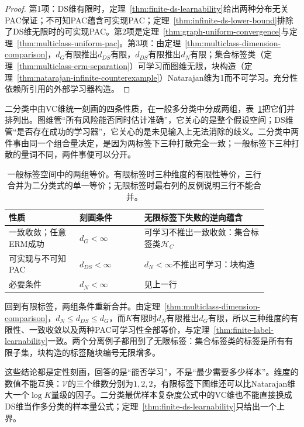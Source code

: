 \begin{proof}
第1项：DS维有限时，定理~\ref{thm:finite-ds-learnability}给出两种分布无关PAC保证；不可知PAC蕴含可实现PAC；定理~\ref{thm:infinite-ds-lower-bound}排除了DS维无限时的可实现PAC。第2项是定理~\ref{thm:graph-uniform-convergence}与定理~\ref{thm:multiclass-uniform-pac}。第3项：由定理~\ref{thm:multiclass-dimension-comparison}，$d_G$有限推出$d_{DS}$有限，$d_{DS}$有限推出$d_N$有限；集合标签类（定理~\ref{thm:multiclass-erm-separation}）可学习而图维无限，块构造（定理~\ref{thm:natarajan-infinite-counterexample}）Natarajan维为1而不可学习。充分性依赖所引用的外部学习器构造。
\end{proof}

二分类中由VC维统一刻画的四条性质，在一般多分类中分成两组，表~\ref{tab:lt6-implication-summary}把它们并排列出。图维管“所有风险能否同时估计准确”，它关心的是整个假设空间；DS维管“是否存在成功的学习器”，它关心的是未见输入上无法消除的歧义。二分类中两件事由同一个组合量决定，是因为两标签下三种打散完全一致；一般标签下三种打散的量词不同，两件事便可以分开。

\begin{table}[htbp]
  \centering
  \begin{tabular}{p{0.24\linewidth}p{0.22\linewidth}p{0.42\linewidth}}
    \toprule
    性质 & 刻画条件 & 无限标签下失败的逆向蕴含\\
    \midrule
    一致收敛；任意ERM成功 & $d_G<\infty$ & 可学习不推出一致收敛：集合标签类$\mathcal H_C$\\
    可实现与不可知PAC & $d_{DS}<\infty$ & $d_N<\infty$不推出可学习：块构造\\
    必要条件 & $d_N<\infty$ & 见上一行\\
    \bottomrule
  \end{tabular}
  \caption{一般标签空间中的两组等价。有限标签时三种维度的有限性等价，三行合并为二分类式的单一等价；无限标签时最右列的反例说明三行不能合并。}
  \label{tab:lt6-implication-summary}
\end{table}

回到有限标签，两组条件重新合并。由定理~\ref{thm:multiclass-dimension-comparison}，$d_N\leq d_{DS}\leq d_G$，而$K$有限时$d_N$有限推出$d_G$有限，所以三种维度的有限性、一致收敛以及两种PAC可学习性全部等价，与定理~\ref{thm:finite-label-learnability}一致。两个分离例子都用到了无限标签：集合标签类的标签是所有有限子集，块构造的标签随块编号无限增多。

这些结论都是定性刻画，回答的是“能否学习”，不是“最少需要多少样本”。维度的数值不能互换：$\mathcal V$的三个维数分别为$1,2,2$，有限标签下图维还可以比Natarajan维大一个$\log K$量级的因子。二分类最优样本复杂度公式中的VC维也不能直接换成DS维当作多分类的样本量公式；定理~\ref{thm:finite-ds-learnability}只给出一个上界。

